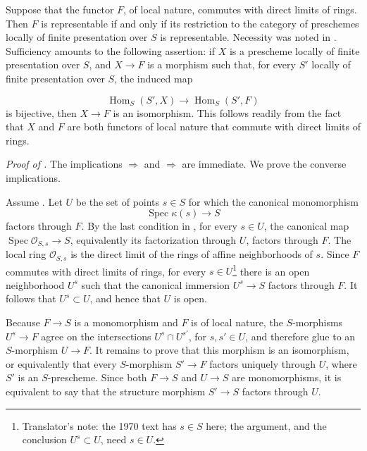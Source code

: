 Suppose that the functor \(F\), of local nature, commutes with direct
limits of rings.  Then \(F\) is representable if and only if its
restriction to the category of preschemes locally of finite
presentation over \(S\) is representable.  Necessity was noted in
.  Sufficiency amounts to the
following assertion: if \(X\) is a prescheme locally of finite
presentation over \(S\), and \(X\to F\) is a morphism such that, for
every \(S'\) locally of finite presentation over \(S\), the induced
map

\[
  \operatorname{Hom}_S(S',X)\longrightarrow
  \operatorname{Hom}_S(S',F)
\]
is bijective, then \(X\to F\) is an isomorphism.  This follows readily
from the fact that \(X\) and \(F\) are both functors of local nature
that commute with direct limits of rings.

\medskip
\noindent\textit{Proof of .}
The implications  \(\Rightarrow\)  and
 \(\Rightarrow\)  are immediate.  We prove the converse
implications.

Assume .  Let \(U\) be the set of points \(s\in S\) for which the
canonical monomorphism
\[
  \operatorname{Spec}\kappa(s)\longrightarrow S
\]
factors through \(F\).  By the last condition in , for every
\(s\in U\), the canonical map
\(\operatorname{Spec}\mathscr O_{S,s}\to S\), equivalently its
factorization through \(U\), factors through \(F\).  The local ring
\(\mathscr O_{S,s}\) is the direct limit of the rings of affine
neighborhoods of \(s\).  Since \(F\) commutes with direct limits of
rings, for every \(s\in U\)\footnote{Translator's note: the 1970 text has \(s\in S\) here; the
argument, and the conclusion \(U^s\subset U\), need \(s\in U\).} there is an open neighborhood
\(U^s\) such that the canonical immersion \(U^s\to S\) factors
through \(F\).  It follows that \(U^s\subset U\), and hence that
\(U\) is open.

Because \(F\to S\) is a monomorphism and \(F\) is of local nature,
the \(S\)-morphisms \(U^s\to F\) agree on the intersections
\(U^s\cap U^{s'}\), for \(s,s'\in U\), and therefore glue to an
\(S\)-morphism \(U\to F\).  It remains to prove that this morphism is
an isomorphism, or equivalently that every \(S\)-morphism \(S'\to F\)
factors uniquely through \(U\), where \(S'\) is an \(S\)-prescheme.
Since both \(F\to S\) and \(U\to S\) are monomorphisms, it is
equivalent to say that the structure morphism \(S'\to S\) factors
through \(U\).

